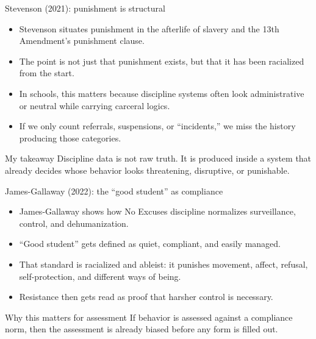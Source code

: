 \documentclass[aspectratio=169,11pt]{beamer}
\begin{document}
\begin{frame}{Stevenson (2021): punishment is structural}
\begin{itemize}
  \item Stevenson situates punishment in the afterlife of slavery and the 13th Amendment's punishment clause.
  \item The point is not just that punishment exists, but that it has been racialized from the start.
  \item In schools, this matters because discipline systems often look administrative or neutral while carrying carceral logics.
  \item If we only count referrals, suspensions, or ``incidents,'' we miss the history producing those categories.
\end{itemize}

\vspace{0.3cm}
\begin{alertblock}{My takeaway}
Discipline data is not raw truth. It is produced inside a system that already decides whose behavior looks threatening, disruptive, or punishable.
\end{alertblock}
\end{frame}

\begin{frame}{James-Gallaway (2022): the ``good student'' as compliance}
\begin{itemize}
  \item James-Gallaway shows how No Excuses discipline normalizes surveillance, control, and dehumanization.
  \item ``Good student'' gets defined as quiet, compliant, and easily managed.
  \item That standard is racialized and ableist: it punishes movement, affect, refusal, self-protection, and different ways of being.
  \item Resistance then gets read as proof that harsher control is necessary.
\end{itemize}

\vspace{0.3cm}
\begin{block}{Why this matters for assessment}
If behavior is assessed against a compliance norm, then the assessment is already biased before any form is filled out.
\end{block}
\end{frame}
\end{document}
